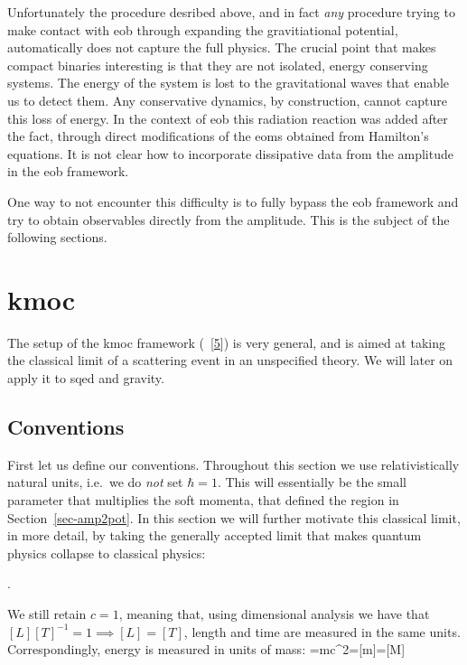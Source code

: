 \documentclass[
  10pt,
  a4paper,
  DIV=11,
  numbers=noendperiod,
  twoside]{scrreprt}
\let\[\relax \let\]\relax %
\DeclareRobustCommand{\[}{\begin{equation}}
\DeclareRobustCommand{\]}{\end{equation}}
\begin{document}
Unfortunately the procedure desribed above, and in fact \emph{any}
procedure trying to make contact with \gls{eob} through expanding the
gravitiational potential, automatically does not capture the full
physics. The crucial point that makes compact binaries interesting is
that they are not isolated, energy conserving systems. The energy of the
system is lost to the gravitational waves that enable us to detect them.
Any conservative dynamics, by construction, cannot capture this loss of
energy. In the context of \gls{eob} this radiation reaction was added
after the fact, through direct modifications of the \gls{eom}s obtained
from Hamilton's equations. It is not clear how to incorporate
dissipative data from the amplitude in the \gls{eob} framework.

One way to not encounter this difficulty is to fully bypass the
\gls{eob} framework and try to obtain observables directly from the
amplitude. This is the subject of the following sections.

\hypertarget{sec-kmoc}{%
\section{\texorpdfstring{\gls{kmoc}}{}}\label{sec-kmoc}}

The setup of the \gls{kmoc} framework
(~{[}\protect\hyperlink{ref-Kosower:2018adc}{5}{]}) is very general, and
is aimed at taking the classical limit of a scattering event in an
unspecified theory. We will later on apply it to \gls{sqed} and gravity.

\hypertarget{conventions}{%
\subsection{Conventions}\label{conventions}}

First let us define our conventions. Throughout this section we use
relativistically natural units, i.e.~we do \emph{not} set \(\hbar=1\).
This will essentially be the small parameter that multiplies the soft
momenta, that defined the region in Section~\ref{sec-amp2pot}. In this
section we will further motivate this classical limit, in more detail,
by taking the generally accepted limit that makes quantum physics
collapse to classical physics:

\[\hbar{}.\]

We still retain \(c=1\), meaning that, using dimensional analysis we
have that \([L][T]^{-1}=1 \implies [L]=[T]\), length and time are
measured in the same units. Correspondingly, energy is measured in units
of mass: \[
\energy=mc^2\implies[\energy]=[m]=[M]
\]
\end{document}

